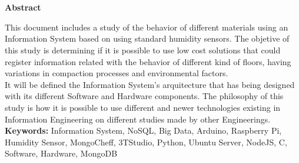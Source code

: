 

\newpage


\chapter*{}
\begin{center}
\textbf{Abstract}
\end{center}

This document includes a study of the behavior of different materials using an Information System based on using standard humidity sensors. The objetive of this study is determining if it is possible to use low cost solutions that could register information related with the behavior of different kind of floors, having variations in compaction processes and environmental factors.\\

It will be defined the Information System's arquitecture that has being designed with its different Software and Hardware components. The philosophy of this study is how it is possible to use different and newer technologies existing in Information Engineering on different studies made by other Engineerings.\\



\noindent
{\bf Keywords:\newline}
Information System, NoSQL, Big Data, Arduino, Raspberry Pi, Humidity Sensor, MongoCheff, 3TStudio, Python, Ubuntu Server, NodeJS, C, Software, Hardware, MongoDB

